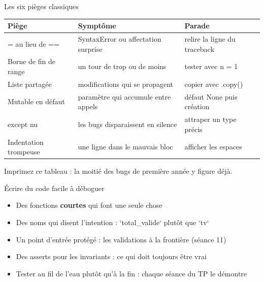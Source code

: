 \documentclass[aspectratio=169,11pt]{beamer}
\begin{document}
\begin{frame}{Les six pièges classiques}
\renewcommand{\arraystretch}{1.3}\small
\begin{center}
\begin{tabular}{lll}
\toprule
\textbf{\color{PyBleu}Piège} & \textbf{\color{PyBleu}Symptôme} & \textbf{\color{PyBleu}Parade} \\
\midrule
= au lieu de == & SyntaxError ou affectation surprise & relire la ligne du traceback \\
Borne de fin de range & un tour de trop ou de moins & tester avec n = 1 \\
Liste partagée & modifications qui se propagent & copier avec .copy() \\
Mutable en défaut & paramètre qui accumule entre appels & défaut None puis création \\
except nu & les bugs disparaissent en silence & attraper un type précis \\
Indentation trompeuse & une ligne dans le mauvais bloc & afficher les espaces \\
\bottomrule
\end{tabular}
\end{center}

\vspace{4pt}

{\small\color{PyGris}Imprimez ce tableau : la moitié des bugs de première année y figure déjà.}
\end{frame}

\begin{frame}{Écrire du code facile à déboguer}
\begin{itemize}
  \item Des fonctions \textbf{courtes} qui font une seule chose
  \item Des noms qui disent l'intention : `total\_valide` plutôt que `tv`
  \item Un point d'entrée protégé : les validations à la frontière (séance 11)
  \item Des asserts pour les invariants : ce qui doit toujours être vrai
  \item Tester au fil de l'eau plutôt qu'à la fin : chaque séance du TP le démontre
\end{itemize}
\end{frame}
\end{document}
